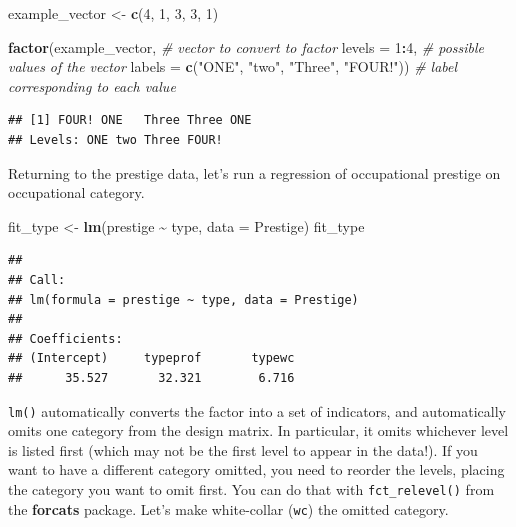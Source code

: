 \documentclass[
  12pt,
  oneside,openany]{book}
\newenvironment{Shaded}{\begin{snugshade}}{\end{snugshade}}
\newcommand{\CommentTok}[1]{\textcolor[rgb]{0.56,0.35,0.01}{\textit{#1}}}
\newcommand{\DataTypeTok}[1]{\textcolor[rgb]{0.13,0.29,0.53}{#1}}
\newcommand{\DecValTok}[1]{\textcolor[rgb]{0.00,0.00,0.81}{#1}}
\newcommand{\KeywordTok}[1]{\textcolor[rgb]{0.13,0.29,0.53}{\textbf{#1}}}
\newcommand{\NormalTok}[1]{#1}
\newcommand{\OperatorTok}[1]{\textcolor[rgb]{0.81,0.36,0.00}{\textbf{#1}}}
\newcommand{\StringTok}[1]{\textcolor[rgb]{0.31,0.60,0.02}{#1}}
\begin{document}
\begin{Shaded}
\begin{Highlighting}[]
\NormalTok{example\_vector <{-}}\StringTok{ }\KeywordTok{c}\NormalTok{(}\DecValTok{4}\NormalTok{, }\DecValTok{1}\NormalTok{, }\DecValTok{3}\NormalTok{, }\DecValTok{3}\NormalTok{, }\DecValTok{1}\NormalTok{)}

\KeywordTok{factor}\NormalTok{(example\_vector,  }\CommentTok{\# vector to convert to factor}
       \DataTypeTok{levels =} \DecValTok{1}\OperatorTok{:}\DecValTok{4}\NormalTok{,    }\CommentTok{\# possible values of the vector}
       \DataTypeTok{labels =} \KeywordTok{c}\NormalTok{(}\StringTok{"ONE"}\NormalTok{,}
                  \StringTok{"two"}\NormalTok{,}
                  \StringTok{"Three"}\NormalTok{,}
                  \StringTok{"FOUR!"}\NormalTok{))  }\CommentTok{\# label corresponding to each value}
\end{Highlighting}
\end{Shaded}

\begin{verbatim}
## [1] FOUR! ONE   Three Three ONE  
## Levels: ONE two Three FOUR!
\end{verbatim}

Returning to the prestige data, let's run a regression of occupational prestige on occupational category.

\begin{Shaded}
\begin{Highlighting}[]
\NormalTok{fit\_type <{-}}\StringTok{ }\KeywordTok{lm}\NormalTok{(prestige }\OperatorTok{\textasciitilde{}}\StringTok{ }\NormalTok{type, }\DataTypeTok{data =}\NormalTok{ Prestige)}
\NormalTok{fit\_type}
\end{Highlighting}
\end{Shaded}

\begin{verbatim}
## 
## Call:
## lm(formula = prestige ~ type, data = Prestige)
## 
## Coefficients:
## (Intercept)     typeprof       typewc  
##      35.527       32.321        6.716
\end{verbatim}

\texttt{lm()} automatically converts the factor into a set of indicators, and automatically omits one category from the design matrix. In particular, it omits whichever level is listed first (which may not be the first level to appear in the data!). If you want to have a different category omitted, you need to reorder the levels, placing the category you want to omit first. You can do that with \texttt{fct\_relevel()} from the \textbf{forcats} package. Let's make white-collar (\texttt{wc}) the omitted category.
\end{document}
